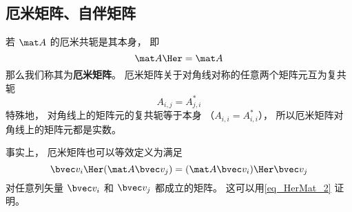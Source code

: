 \subsection{厄米矩阵、自伴矩阵}
若 $\mat A$ 的厄米共轭是其本身， 即
\begin{equation}
\mat A\Her = \mat A
\end{equation}
那么我们称其为\textbf{厄米矩阵}。 厄米矩阵关于对角线对称的任意两个矩阵元互为复共轭
\begin{equation}
A_{i,j} = A_{j,i}^*
\end{equation}
特殊地， 对角线上的矩阵元的复共轭等于本身 （$A_{i,i} = A_{i,i}^*$）， 所以厄米矩阵对角线上的矩阵元都是实数。

事实上， 厄米矩阵也可以等效定义为满足
\begin{equation}
\bvec v_i\Her (\mat A \bvec v_j) = (\mat A \bvec v_i)\Her \bvec v_j
\end{equation}
对任意列矢量 $\bvec v_i$ 和 $\bvec v_j$ 都成立的矩阵。 这可以用\autoref{eq_HerMat_2} 证明。
